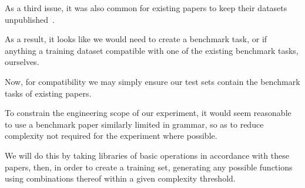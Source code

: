 \documentclass{article}
\begin{document}
As a third issue, it was also common for existing papers to keep their datasets unpublished~\citep{nsps,deepcoder}.


As a result, it looks like we would need to create a benchmark task, or if anything a training dataset compatible with one of the existing benchmark tasks, ourselves.

Now, for compatibility we may simply ensure our test sets contain the benchmark tasks of existing papers.

To constrain the engineering scope of our experiment, it would seem reasonable to use a benchmark paper similarly limited in grammar, so as to reduce complexity not required for the experiment where possible.



We will do this by taking libraries of basic operations in accordance with these papers, then, in order to create a training set, generating any possible functions using combinations thereof within a given complexity threshold.
\end{document}
